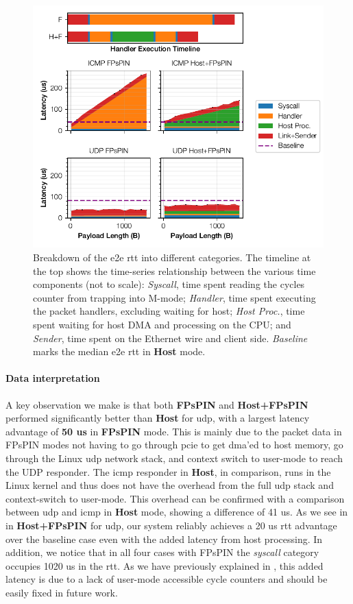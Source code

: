 \begin{figure}[tp]
    \centering
    \includegraphics{figures/pingpong-breakdown.pdf}
    \caption{Breakdown of the \ac{e2e} \ac{rtt} into different categories.  The timeline at the top shows the time-series relationship between the various time components (not to scale): \emph{Syscall}, time spent reading the cycles counter from trapping into M-mode; \emph{Handler}, time spent executing the packet handlers, excluding waiting for host; \emph{Host Proc.}, time spent waiting for host DMA and processing on the CPU; and \emph{Sender}, time spent on the Ethernet wire and client side.  \emph{Baseline} marks the median \ac{e2e} \ac{rtt} in \textbf{Host} mode.} \label{fig:pingpong-breakdown}
\end{figure}

\paragraph{Data interpretation} A key observation we make is that both \textbf{FPsPIN} and \textbf{Host+FPsPIN} performed significantly better than \textbf{Host} for \ac{udp}, with a largest latency advantage of \textbf{50 us} in \textbf{FPsPIN} mode.  This is mainly due to the packet data in FPsPIN modes not having to go through \ac{pcie} to get \ac{dma}'ed to host memory, go through the Linux \ac{udp} network stack, and context switch to user-mode to reach the UDP responder.  The \ac{icmp} responder in \textbf{Host}, in comparison, runs in the Linux kernel and thus does not have the overhead from the full \ac{udp} stack and context-switch to user-mode.  This overhead can be confirmed with a comparison between \ac{udp} and \ac{icmp} in \textbf{Host} mode, showing a difference of \mytilde{}41 us.  As we see in  in \textbf{Host+FPsPIN} for \ac{udp}, our system reliably achieves a \mytilde{}20 us \ac{rtt} advantage over the baseline case even with the added latency from host processing.  In addition, we notice that in all four cases with FPsPIN the \emph{syscall} category occupies 10\mytilde{}20 us in the \ac{rtt}.  As we have previously explained in , this added latency is due to a lack of user-mode accessible cycle counters and should be easily fixed in future work.


